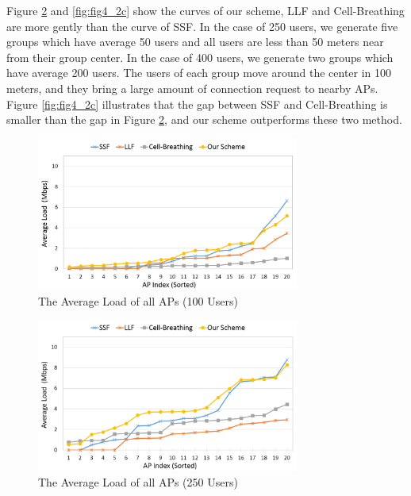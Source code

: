 Figure \ref{fig:fig4_2b} and \ref{fig:fig4_2c} show the curves of our scheme, LLF and Cell-Breathing are more gently than the curve of SSF. In the case of 250 users, we generate five groups which have average 50 users and all users are less than 50 meters near from their group center. In the case of 400 users, we generate two groups which have average 200 users. The users of each group move around the center in 100 meters, and they bring a large amount of connection request to nearby APs. Figure \ref{fig:fig4_2c} illustrates that the gap between SSF and Cell-Breathing is smaller than the gap in Figure \ref{fig:fig4_2b}, and our scheme outperforms these two method.

\begin{figure}[tbp]
\setlength{\abovecaptionskip}{0pt}
\setlength{\belowcaptionskip}{0pt}
\begin{center}
\includegraphics[width=3.4in]{images/Average_AP_load_100.png}
\end{center}
\caption{The Average Load of all APs (100 Users)}
\label{fig:fig4_2a}
\end{figure}

\begin{figure}[tbp]
\setlength{\abovecaptionskip}{0pt}
\setlength{\belowcaptionskip}{0pt}
\begin{center}
\includegraphics[width=3.4in]{images/Average_AP_load_250.png}
\end{center}
\caption{The Average Load of all APs (250 Users)}
\label{fig:fig4_2b}
\end{figure}

